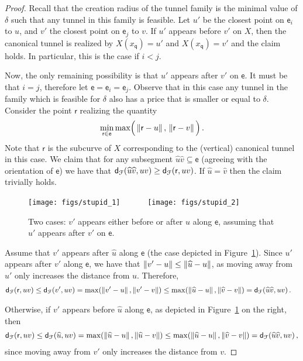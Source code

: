 \documentclass[12pt]{article}
\providecommand{\si}[1]{#1}
\newcommand{\figlab}[1]{\label{fig:#1}}
\newcommand{\figref}[1]{Figure~\ref{fig:#1}}
\newcommand{\distFr}[2]{\mathsf{d}_{\EuScript{F}}\pth{#1, #2}}
\newcommand{\distX}[2]{\distCmd{#1 - #2}}
\newcommand{\pntA}{\mathsf{q}}
\newcommand{\pntB}{\mathsf{r}}
\newcommand{\x}{x}
\newcommand{\ACoord}[1]{\x_{#1}}
\newcommand{\xPntA}{\ACoord{\pntA}}
\newcommand{\SimplifyX}[1]{#1}
\newcommand{\cXBase}{X} \newcommand{\cYBase}{Y} \newcommand{\crvCBase}{{\pi}}
\newcommand{\cX}{\SimplifyX{\cXBase}}
\providecommand{\pth}[2][\!]{#1\left({#2}\right)}
\providecommand{\MakeSBig}{\rule[0.0cm]{0.0cm}{0.35cm}}
\newcommand{\edge}{\mathsf{e}}
\newcommand{\tunnel}{tunnel\xspace}
\newcommand{\wu}{\widehat{u}}
\newcommand{\wv}{\widehat{v}}
\numberwithin{figure}{section}
\numberwithin{equation}{section}
\begin{document}
\begin{proof}
    Recall that the creation radius of the \tunnel family is the
    minimal value of $\delta$ such that any \tunnel in this family is
    feasible. Let $u'$ be the closest point on $\edge_i$ to $u$, and
    $v'$ the closest point on $\edge_j$ to $v$.  If $u'$ appears
    before $v'$ on $\cX$, then the canonical \tunnel is realized by
    $\cX(\xPntA)=u'$ and $\cX(\xPntA)=v'$ and the claim holds. In
    particular, this is the case if $i < j$.
    
    Now, the only remaining possibility is that $u'$ appears after
    $v'$ on $\edge$. It must be that $i=j$, therefore let
    $\edge=\edge_i=\edge_j$.  Observe that in this case any \tunnel in
    the family which is feasible for $\delta$ also has a price that is
    smaller or equal to $\delta$.
Consider the point $\pntB$ realizing the quantity
    \begin{align*}
        \min_{\pntB \in \edge} \max \pth{\, \MakeSBig\!
           \distX{\pntB}{u} ,\, \distX{\pntB}{v} \,}.
    \end{align*}
    Note that $\pntB$ is the subcurve of $\cX$ corresponding to the
    (vertical) canonical \tunnel in this case.  We claim that for any
    subsegment $\wu \wv \subseteq \edge$ (agreeing with the
    orientation of $\edge$) we have that $\distFr{\wu \wv}{uv} \geq
    \distFr{\pntB}{uv}$.  If $\wu = \wv$ then the claim trivially
    holds.
    
    \begin{figure}[\si{tb}]\center
        \texttt{[image: figs/stupid\_1]}
        ~~~~~~\texttt{[image: figs/stupid\_2]}
        \caption{Two cases: $v'$ appears either before or after $\wu$
           along $\edge$, assuming that $u'$ appears after $v'$ on
           $\edge$.}
        \figlab{stupid}
    \end{figure}
    
    Assume that $v'$ appears after $\wu$ along $\edge$ (the case
    depicted in \figref{stupid}). Since $u'$ appears after $v'$ along
    $\edge$, we have that $\distX{v'}{u} \leq \distX{\wu}{u}$, as
    moving away from $u'$ only increases the distance from
    $u$. Therefore,
    \begin{align*}
        \distFr{\pntB}{uv} &\leq \distFr{v'}{uv} = \max\pth{\distX{v'}{u},
           \distX{v'}{v}}\leq \max\pth{\distX{\wu}{u}, \distX{\wv}{v}}=\distFr{\wu \wv}{uv}.
    \end{align*}
    
    Otherwise, if $v'$ appears before $\wu$ along $\edge$, as depicted
    in \figref{stupid} on the right, then
    \begin{align*}
        \distFr{\pntB}{uv} \leq \distFr{\wu}{uv} = \max\pth{\distX{\wu}{u}, \distX{\wu}{v}}\leq \max\pth{\distX{\wu}{u}, \distX{\wv}{v}} =\distFr{\wu \wv}{uv},
    \end{align*}
    since moving away from $v'$ only increases the distance from $v$.
    

\end{proof}
\end{document}

